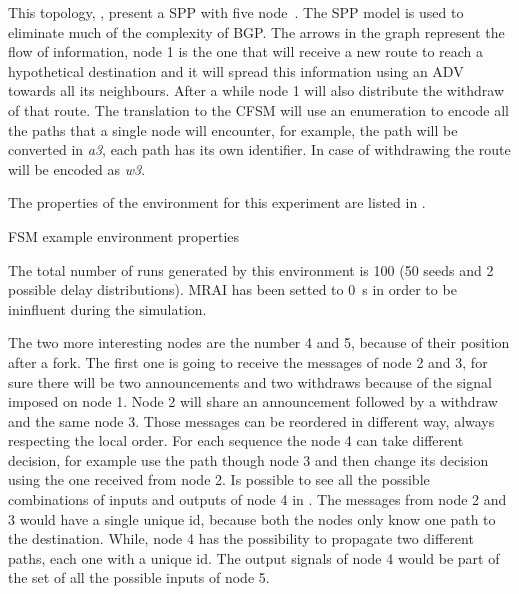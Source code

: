 This topology, , present a \ac{SPP} with five node~\cite{griffin2002stable}.
The \ac{SPP} model is used to eliminate much of the complexity of \ac{BGP}.
The arrows in the graph represent the flow of information, node \num{1} is the one
that will receive a new route to reach a hypothetical destination and it will
spread this information using an \ac{ADV} towards all its neighbours.
After a while node \num{1} will also distribute the withdraw of that route.
The translation to the \ac{CFSM} will use an enumeration to encode all the
paths that a single node will encounter, for example, the path  will
be converted in \textit{a3}, each path has its own identifier.
In case of withdrawing the route will be encoded as \textit{w3}.

The properties of the environment for this experiment are listed in .

\begin{table}[h]
	
	\caption{FSM example environment properties}
	\label{tbl:fig_4_example}
\end{table}

The total number of runs generated by this environment is \num{100} (\num{50} seeds
and \num{2} possible delay distributions).
\ac{MRAI} has been setted to \SI{0}{\second} in order to be ininfluent
during the simulation.

The two more interesting nodes are the number \num{4} and \num{5}, because of their
position after a fork.
The first one is going to receive the messages of node \num{2} and \num{3}, for
sure there will be two announcements and two withdraws because of the signal
imposed on node 1.
Node \num{2} will share an announcement followed by a withdraw and the same node
\num{3}.
Those messages can be reordered in different way, always respecting the local
order.
For each sequence the node \num{4} can take different decision, for
example use the path though node \num{3} and then change its decision using the
one received from node \num{2}.
Is possible to see all the possible combinations of inputs and outputs of node
\num{4} in .
The messages from node \num{2} and \num{3} would have a single unique id, because
both the nodes only know one path to the destination.
While, node \num{4} has the possibility to propagate two different paths, each
one with a unique id.
The output signals of node \num{4} would be part of the set of all the possible
inputs of node \num{5}.

